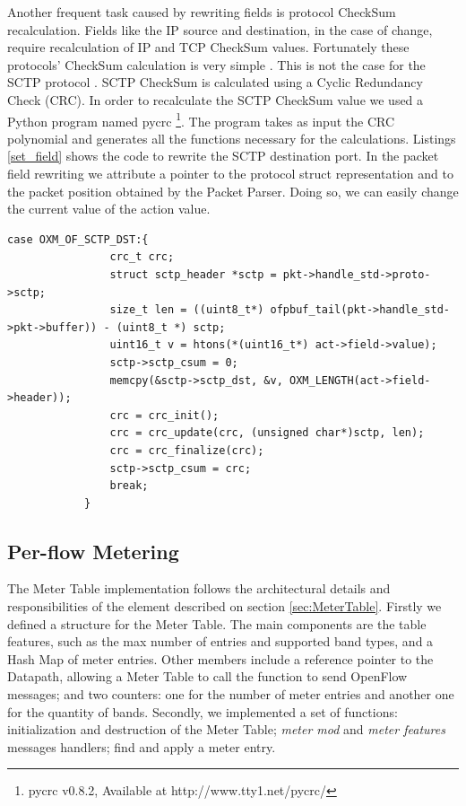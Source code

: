 Another frequent task caused by rewriting fields is protocol CheckSum recalculation. Fields like the IP source and destination, in the case of change, require recalculation of IP and TCP CheckSum values. Fortunately these protocols' CheckSum calculation is very simple \cite{rfc1071}. This is not the case for the SCTP protocol \cite{rfc3309}. SCTP CheckSum is calculated using a Cyclic Redundancy Check (CRC). In order to recalculate the SCTP CheckSum value we used a Python program named pycrc \footnote{pycrc v0.8.2, Available at http://www.tty1.net/pycrc/}. The program takes as input the CRC polynomial and generates all the functions necessary for the calculations. Listings \ref{set_field} shows the code to rewrite the SCTP destination port. In the packet field rewriting we attribute a pointer to the protocol struct representation and to the packet position obtained by the Packet Parser. Doing so, we can easily change the current value of the action value.
\\
\begin{lstlisting}[caption={Ethernet parsing in the nbee_link module}, label=set_field,]
case OXM_OF_SCTP_DST:{
                crc_t crc;
                struct sctp_header *sctp = pkt->handle_std->proto->sctp;                
                size_t len = ((uint8_t*) ofpbuf_tail(pkt->handle_std->pkt->buffer)) - (uint8_t *) sctp;
                uint16_t v = htons(*(uint16_t*) act->field->value);
                sctp->sctp_csum = 0;
                memcpy(&sctp->sctp_dst, &v, OXM_LENGTH(act->field->header));
                crc = crc_init();
                crc = crc_update(crc, (unsigned char*)sctp, len);                            
                crc = crc_finalize(crc);
                sctp->sctp_csum = crc;
                break;        
            }
\end{lstlisting}  

\subsection{Per-flow Metering}

    The Meter Table implementation follows the architectural details and responsibilities of the element described on section \ref{sec:MeterTable}.
Firstly we defined a structure for the Meter Table. The main components are the table features, such as the max number of entries and supported band types, and a Hash Map of meter entries. Other members include a reference pointer to the Datapath, allowing a Meter Table to call the function to send OpenFlow messages; and two counters: one for the number of meter entries and another one for the quantity of bands. Secondly, we implemented a set of functions: initialization and destruction of the Meter Table; \textit{meter mod} and \textit{meter features} messages handlers; find and apply a meter entry.

